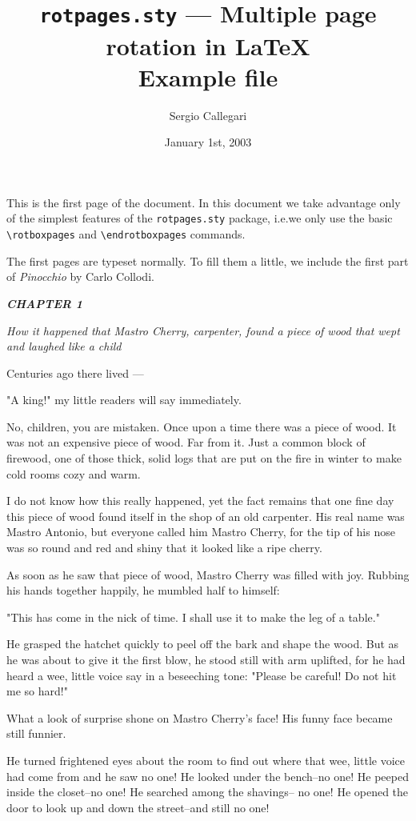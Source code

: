 \documentclass[12pt,twoside]{article}
\title{\texttt{rotpages.sty} --- Multiple page rotation in \LaTeX\\
  Example file}
\author{Sergio Callegari}
\date{January 1st, 2003}
\begin{document}
\sloppy
\pagestyle{fancy}
\maketitle
\thispagestyle{fancy}

This is the first page of the document. In this document we take
advantage only of the simplest features of the \texttt{rotpages.sty}
package, i.e.\@ we only use the basic \verb|\rotboxpages| and
\verb|\endrotboxpages| commands.


The first pages are typeset normally.  To fill them a little, we include
the first part of \emph{Pinocchio} by Carlo Collodi.

\bigskip
{\slshape%
  \textbf{CHAPTER 1}
  
  \emph{How it happened that Mastro Cherry, carpenter,
  found a piece of wood that wept and laughed like a child}
  \medskip
 
  Centuries ago there lived ---
  
  "A king!" my little readers will say immediately.
  
  No, children, you are mistaken.  Once upon a time
  there was a piece of wood.  It was not an expensive piece
  of wood.  Far from it.  Just a common block of firewood,
  one of those thick, solid logs that are put on the fire in
  winter to make cold rooms cozy and warm.
  
  I do not know how this really happened, yet the fact
  remains that one fine day this piece of wood found itself
  in the shop of an old carpenter.  His real name was
  Mastro Antonio, but everyone called him Mastro Cherry,
  for the tip of his nose was so round and red and shiny
  that it looked like a ripe cherry.
  
  As soon as he saw that piece of wood, Mastro Cherry
  was filled with joy.  Rubbing his hands together happily,
  he mumbled half to himself:
  
  "This has come in the nick of time.  I shall use it to
  make the leg of a table."
  
  He grasped the hatchet quickly to peel off the bark and
  shape the wood.  But as he was about to give it the first
  blow, he stood still with arm uplifted, for he had heard a
  wee, little voice say in a beseeching tone:  "Please be careful!
  Do not hit me so hard!"
  
  What a look of surprise shone on Mastro Cherry's
  face!  His funny face became still funnier.
  
  He turned frightened eyes about the room to find out
  where that wee, little voice had come from and he saw
  no one! He looked under the bench--no one! He peeped
  inside the closet--no one! He searched among the shavings--
  no one! He opened the door to look up and down
  the street--and still no one!

}
\end{document}
